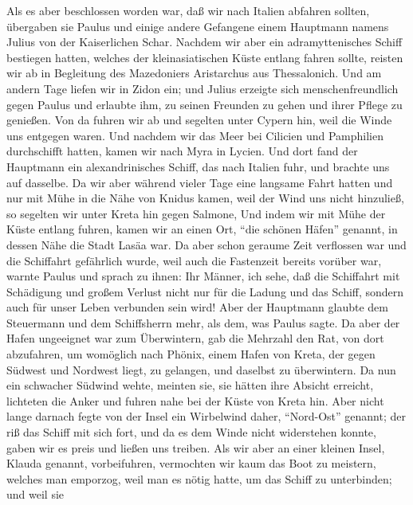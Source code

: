  Als es aber beschlossen worden war, daß wir nach Italien
abfahren sollten, übergaben sie Paulus und einige andere Gefangene einem
Hauptmann namens Julius von der Kaiserlichen Schar. 
Nachdem wir aber ein adramyttenisches Schiff bestiegen hatten, welches
der kleinasiatischen Küste entlang fahren sollte, reisten wir ab in
Begleitung des Mazedoniers Aristarchus aus Thessalonich. 
Und am andern Tage liefen wir in Zidon ein; und Julius erzeigte sich
menschenfreundlich gegen Paulus und erlaubte ihm, zu seinen Freunden zu
gehen und ihrer Pflege zu genießen.  Von da fuhren wir ab
und segelten unter Cypern hin, weil die Winde uns entgegen waren.
 Und nachdem wir das Meer bei Cilicien und Pamphilien
durchschifft hatten, kamen wir nach Myra in Lycien.  Und
dort fand der Hauptmann ein alexandrinisches Schiff, das nach Italien
fuhr, und brachte uns auf dasselbe.  Da wir aber während
vieler Tage eine langsame Fahrt hatten und nur mit Mühe in die Nähe von
Knidus kamen, weil der Wind uns nicht hinzuließ, so segelten wir unter
Kreta hin gegen Salmone,  Und indem wir mit Mühe der Küste
entlang fuhren, kamen wir an einen Ort, ``die schönen Häfen'' genannt,
in dessen Nähe die Stadt Lasäa war.  Da aber schon geraume
Zeit verflossen war und die Schiffahrt gefährlich wurde, weil auch die
Fastenzeit bereits vorüber war, warnte Paulus und sprach zu ihnen:
 Ihr Männer, ich sehe, daß die Schiffahrt mit Schädigung
und großem Verlust nicht nur für die Ladung und das Schiff, sondern auch
für unser Leben verbunden sein wird!  Aber der Hauptmann
glaubte dem Steuermann und dem Schiffsherrn mehr, als dem, was Paulus
sagte.  Da aber der Hafen ungeeignet war zum Überwintern,
gab die Mehrzahl den Rat, von dort abzufahren, um womöglich nach Phönix,
einem Hafen von Kreta, der gegen Südwest und Nordwest liegt, zu
gelangen, und daselbst zu überwintern.  Da nun ein
schwacher Südwind wehte, meinten sie, sie hätten ihre Absicht erreicht,
lichteten die Anker und fuhren nahe bei der Küste von Kreta hin.
 Aber nicht lange darnach fegte von der Insel ein
Wirbelwind daher, ``Nord-Ost'' genannt;  der riß das
Schiff mit sich fort, und da es dem Winde nicht widerstehen konnte,
gaben wir es preis und ließen uns treiben.  Als wir aber
an einer kleinen Insel, Klauda genannt, vorbeifuhren, vermochten wir
kaum das Boot zu meistern, welches man emporzog, weil man es nötig
hatte, um das Schiff zu unterbinden;  und weil sie
